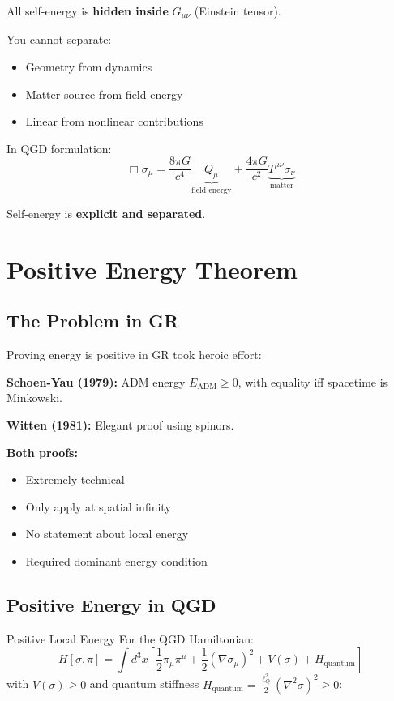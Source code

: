 \documentclass[11pt,a4paper]{article}
\theoremstyle{definition}
\theoremstyle{remark}
\begin{document}
	All self-energy is \textbf{hidden inside} $G_{\mu\nu}$ (Einstein tensor).
	
	You cannot separate:
	\begin{itemize}
		\item Geometry from dynamics
		\item Matter source from field energy
		\item Linear from nonlinear contributions
	\end{itemize}
	
	In QGD formulation:
	\begin{equation}
		\Box\sigma_\mu = \frac{8\pi G}{c^4}\underbrace{Q_\mu}_{\text{field energy}} + \frac{4\pi G}{c^2}\underbrace{T^{\mu\nu}\sigma_\nu}_{\text{matter}}
	\end{equation}
	
	Self-energy is \textbf{explicit and separated}.
	
	\section{Positive Energy Theorem}
	
	\subsection{The Problem in GR}
	
	Proving energy is positive in GR took heroic effort:
	
	\textbf{Schoen-Yau (1979):} ADM energy $E_{\text{ADM}} \geq 0$, with equality iff spacetime is Minkowski.
	
	\textbf{Witten (1981):} Elegant proof using spinors.
	
	\textbf{Both proofs:}
	\begin{itemize}
		\item Extremely technical
		\item Only apply at spatial infinity
		\item No statement about local energy
		\item Required dominant energy condition
	\end{itemize}
	
	\subsection{Positive Energy in QGD}
	
	Positive Local Energy
		For the QGD Hamiltonian:
		\begin{equation}
			H[\sigma, \pi] = \int d^3x\left[\frac{1}{2}\pi_\mu\pi^\mu + \frac{1}{2}(\nabla\sigma_\mu)^2 + V(\sigma) + H_{\text{quantum}}\right]
		\end{equation}
		with $V(\sigma) \geq 0$ and quantum stiffness $H_{\text{quantum}} = \frac{\ell_Q^2}{2}(\nabla^2\sigma)^2 \geq 0$:
		
\end{document}

